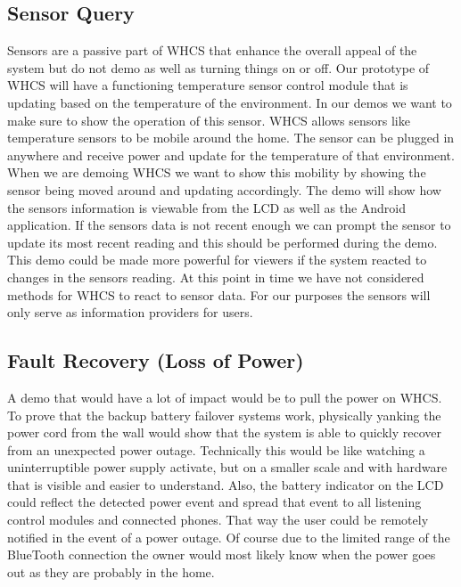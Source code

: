 \subsection{Sensor Query}
Sensors are a passive part of WHCS that enhance the overall appeal of the
system but do not demo as well as turning things on or off. Our prototype of
WHCS will have a functioning temperature sensor control module that is updating
based on the temperature of the environment. In our demos we want to make sure
to show the operation of this sensor.  WHCS allows sensors like temperature
sensors to be mobile around the home. The sensor can be plugged in anywhere and
receive power and update for the temperature of that environment. When we are
demoing WHCS we want to show this mobility by showing the sensor being moved
around and updating accordingly. The demo will show how the sensors information
is viewable from the LCD as well as the Android application. If the sensors
data is not recent enough we can prompt the sensor to update its most recent
reading and this should be performed during the demo. This demo could be made
more powerful for viewers if the system reacted to changes in the sensors
reading. At this point in time we have not considered methods for WHCS to react
to sensor data. For our purposes the sensors will only serve as information
providers for users.

\subsection{Fault Recovery (Loss of Power)}
A demo that would have a lot of impact would be to pull the power on WHCS. To
prove that the backup battery failover systems work, physically yanking the
power cord from the wall would show that the system is able to quickly recover
from an unexpected power outage. Technically this would be like watching a
uninterruptible power supply activate, but on a smaller scale and with hardware
that is visible and easier to understand. Also, the battery indicator on the
LCD could reflect the detected power event and spread that event to all
listening control modules and connected phones. That way the user could be
remotely notified in the event of a power outage. Of course due to the limited
range of the BlueTooth connection the owner would most likely know when the
power goes out as they are probably in the home.

